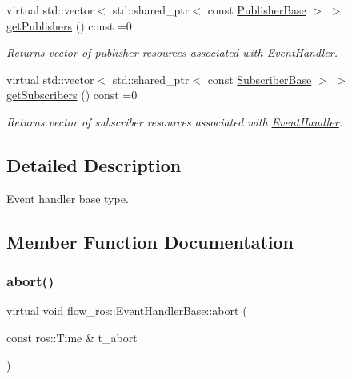 \begin{DoxyCompactItemize}
virtual std\+::vector$<$ std\+::shared\+\_\+ptr$<$ const \hyperlink{classflow__ros_1_1_publisher_base}{Publisher\+Base} $>$ $>$ \hyperlink{classflow__ros_1_1_event_handler_base_a1e476ba767ddceda60aadc5655ef33ed}{get\+Publishers} () const =0
\begin{DoxyCompactList}\small\item\em Returns vector of publisher resources associated with \hyperlink{classflow__ros_1_1_event_handler}{Event\+Handler}. \end{DoxyCompactList}\item 
virtual std\+::vector$<$ std\+::shared\+\_\+ptr$<$ const \hyperlink{classflow__ros_1_1_subscriber_base}{Subscriber\+Base} $>$ $>$ \hyperlink{classflow__ros_1_1_event_handler_base_a5c6b2e230dcb308eff3f0aea18c47be3}{get\+Subscribers} () const =0
\begin{DoxyCompactList}\small\item\em Returns vector of subscriber resources associated with \hyperlink{classflow__ros_1_1_event_handler}{Event\+Handler}. \end{DoxyCompactList}\end{DoxyCompactItemize}


\subsection{Detailed Description}
Event handler base type. 

\subsection{Member Function Documentation}
\mbox{\label{classflow__ros_1_1_event_handler_base_a5611152cffdc62a4215726d19ce58ab5}} 
\subsubsection{\texorpdfstring{abort()}{abort()}}
{\footnotesize\ttfamily virtual void flow\+\_\+ros\+::\+Event\+Handler\+Base\+::abort (\begin{DoxyParamCaption}\item[{const ros\+::\+Time \&}]{t\+\_\+abort }\end{DoxyParamCaption})\hspace{0.3cm}{\ttfamily [pure virtual]}}



